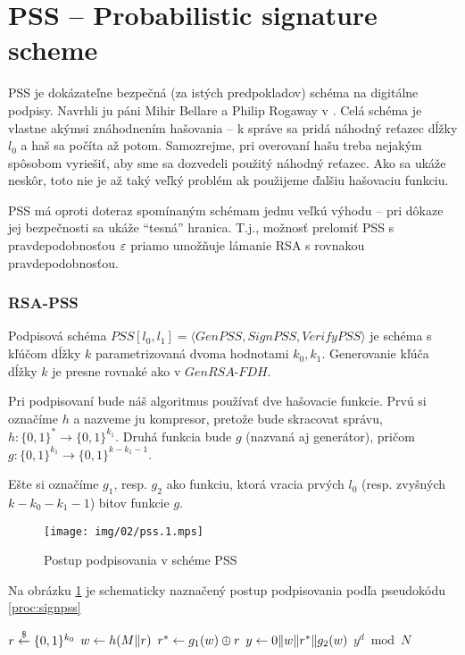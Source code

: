 \section{PSS -- Probabilistic signature scheme}

PSS je dokázateľne bezpečná (za istých predpokladov) schéma na
digitálne podpisy. Navrhli ju páni Mihir Bellare a Philip Rogaway
v \cite{pss}. Celá schéma je vlastne akýmsi znáhodnením hašovania -- k
správe sa pridá náhodný reťazec dĺžky $l_0$ a haš sa počíta až
potom. Samozrejme, pri overovaní hašu treba nejakým spôsobom
vyriešiť, aby sme sa dozvedeli použitý náhodný reťazec. Ako sa ukáže
neskôr, toto nie je až taký veľký problém ak použijeme ďalšiu
hašovaciu funkciu.

PSS má oproti doteraz spomínaným schémam jednu veľkú výhodu -- pri
dôkaze jej bezpečnosti sa ukáže ``tesná'' hranica. T.j., možnosť
prelomiť PSS s pravdepodobnosťou $\varepsilon$ priamo umožňuje lámanie RSA s
rovnakou pravdepodobnosťou.


\subsubsection{RSA-PSS}

Podpisová schéma $PSS[l_0,l_1]=\langle GenPSS,SignPSS,VerifyPSS\rangle$ je
schéma s kľúčom dĺžky $k$ parametrizovaná dvoma hodnotami $k_0, k_1$.
Generovanie kľúča dĺžky $k$ je presne rovnaké ako v $GenRSA\mbox{-}FDH$.

Pri podpisovaní bude náš algoritmus používať dve hašovacie funkcie.
Prvú si označíme $h$ a nazveme ju kompresor, pretože bude skracovat
správu, $h:\{0,1\}^* \rightarrow \{0,1\}^{k_1}$.
Druhá funkcia bude $g$ (nazvaná aj generátor), pričom
$g:\{0,1\}^{k_1} \rightarrow \{0,1\}^{k-k_1-1}$.

Ešte si označíme $g_1$, resp. $g_2$ ako funkciu, ktorá vracia
prvých $l_0$ (resp. zvyšných $k-k_0-k_1-1$) bitov funkcie $g$.

\begin{figure}[h]
    \centering
    \texttt{[image: img/02/pss.1.mps]}
    \caption{Postup podpisovania v schéme PSS}
    \label{fig:pss}

\end{figure}
Na obrázku \ref{fig:pss} je schematicky naznačený postup podpisovania
podľa pseudokódu \ref{proc:signpss}

\begin{procedure}
    \caption{SignPSS($m$)}
    \label{proc:signpss}
    $r \overset{\$}{\leftarrow} \{0,1\}^{k_0}$\;
    $w \leftarrow h(M \| r)$\;
    $r^* \leftarrow g_1(w) \oplus r$\;
    $y \leftarrow 0 \| w \| r^* \| g_2(w)$\;
    \Return $y^d \bmod N$\;
\end{procedure}

